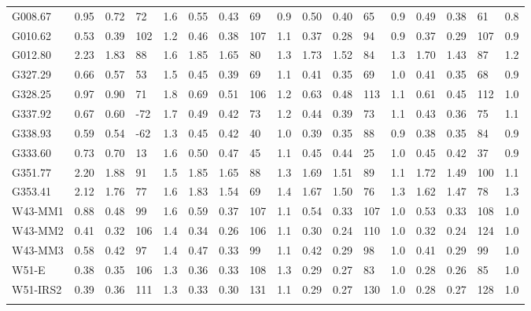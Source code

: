 \begin{table}[htbp!]
\begin{tabular}{@{\extracolsep{2pt}}lllllllllllllllll@{}}
G008.67    &  0.95&0.72&72&1.6&0.55&0.43&69&0.9&0.50&0.40&65&0.9&0.49&0.38&61&0.8 \\
G010.62    &  0.53&0.39&102&1.2&0.46&0.38&107&1.1&0.37&0.28&94&0.9&0.37&0.29&107&0.9 \\
G012.80    &  2.23&1.83&88&1.6&1.85&1.65&80&1.3&1.73&1.52&84&1.3&1.70&1.43&87&1.2 \\
G327.29    &  0.66&0.57&53&1.5&0.45&0.39&69&1.1&0.41&0.35&69&1.0&0.41&0.35&68&0.9 \\
G328.25    &  0.97&0.90&71&1.8&0.69&0.51&106&1.2&0.63&0.48&113&1.1&0.61&0.45&112&1.0 \\
G337.92    &  0.67&0.60&-72&1.7&0.49&0.42&73&1.2&0.44&0.39&73&1.1&0.43&0.36&75&1.1 \\
G338.93    &  0.59&0.54&-62&1.3&0.45&0.42&40&1.0&0.39&0.35&88&0.9&0.38&0.35&84&0.9 \\
G333.60    &  0.73&0.70&13&1.6&0.50&0.47&45&1.1&0.45&0.44&25&1.0&0.45&0.42&37&0.9 \\
G351.77    &  2.20&1.88&91&1.5&1.85&1.65&88&1.3&1.69&1.51&89&1.1&1.72&1.49&100&1.1 \\
G353.41    &  2.12&1.76&77&1.6&1.83&1.54&69&1.4&1.67&1.50&76&1.3&1.62&1.47&78&1.3 \\
W43-MM1    &  0.88&0.48&99&1.6&0.59&0.37&107&1.1&0.54&0.33&107&1.0&0.53&0.33&108&1.0 \\
W43-MM2    &  0.41&0.32&106&1.4&0.34&0.26&106&1.1&0.30&0.24&110&1.0&0.32&0.24&124&1.0 \\
W43-MM3    &  0.58&0.42&97&1.4&0.47&0.33&99&1.1&0.42&0.29&98&1.0&0.41&0.29&99&1.0 \\
W51-E    &  0.38&0.35&106&1.3&0.36&0.33&108&1.3&0.29&0.27&83&1.0&0.28&0.26&85&1.0 \\
W51-IRS2    &  0.39&0.36&111&1.3&0.33&0.30&131&1.1&0.29&0.27&130&1.0&0.28&0.27&128&1.0 \\

\hline \noalign {\smallskip}
\end{tabular}

%
\end{table}
